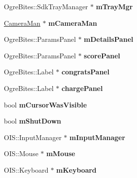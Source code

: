 \begin{DoxyCompactItemize}
\item 
\hypertarget{classMinimalOgre_a8e9a4e09b8b584e30b0f87878a6c62bd}{Ogre\-Bites\-::\-Sdk\-Tray\-Manager $\ast$ {\bfseries m\-Tray\-Mgr}}\label{classMinimalOgre_a8e9a4e09b8b584e30b0f87878a6c62bd}

\item 
\hypertarget{classMinimalOgre_a12259a63e9155b0188653d067583ee1d}{\hyperlink{classCameraMan}{Camera\-Man} $\ast$ {\bfseries m\-Camera\-Man}}\label{classMinimalOgre_a12259a63e9155b0188653d067583ee1d}

\item 
\hypertarget{classMinimalOgre_a30c54a4dab64975aea7a70de53099c5c}{Ogre\-Bites\-::\-Params\-Panel $\ast$ {\bfseries m\-Details\-Panel}}\label{classMinimalOgre_a30c54a4dab64975aea7a70de53099c5c}

\item 
\hypertarget{classMinimalOgre_ab68dcc4fa10f13b57c8ef27de42479eb}{Ogre\-Bites\-::\-Params\-Panel $\ast$ {\bfseries score\-Panel}}\label{classMinimalOgre_ab68dcc4fa10f13b57c8ef27de42479eb}

\item 
\hypertarget{classMinimalOgre_acdd1690608243ea17c28596261d19f06}{Ogre\-Bites\-::\-Label $\ast$ {\bfseries congrats\-Panel}}\label{classMinimalOgre_acdd1690608243ea17c28596261d19f06}

\item 
\hypertarget{classMinimalOgre_aa19c4513b1ea2effd67de0bd239bf86c}{Ogre\-Bites\-::\-Label $\ast$ {\bfseries charge\-Panel}}\label{classMinimalOgre_aa19c4513b1ea2effd67de0bd239bf86c}

\item 
\hypertarget{classMinimalOgre_a7f2583d380bcc784c9422d353995f885}{bool {\bfseries m\-Cursor\-Was\-Visible}}\label{classMinimalOgre_a7f2583d380bcc784c9422d353995f885}

\item 
\hypertarget{classMinimalOgre_a169d2cbf6984af70337a80bd31a97ccb}{bool {\bfseries m\-Shut\-Down}}\label{classMinimalOgre_a169d2cbf6984af70337a80bd31a97ccb}

\item 
\hypertarget{classMinimalOgre_a4f2ba1739999fa80877ab2c33dacff5d}{O\-I\-S\-::\-Input\-Manager $\ast$ {\bfseries m\-Input\-Manager}}\label{classMinimalOgre_a4f2ba1739999fa80877ab2c33dacff5d}

\item 
\hypertarget{classMinimalOgre_a002a30acbb64e62932a50c3135217a60}{O\-I\-S\-::\-Mouse $\ast$ {\bfseries m\-Mouse}}\label{classMinimalOgre_a002a30acbb64e62932a50c3135217a60}

\item 
\hypertarget{classMinimalOgre_a8bfc781c7222a2d6fbff1d2bc985ac3b}{O\-I\-S\-::\-Keyboard $\ast$ {\bfseries m\-Keyboard}}\label{classMinimalOgre_a8bfc781c7222a2d6fbff1d2bc985ac3b}

\end{DoxyCompactItemize}
